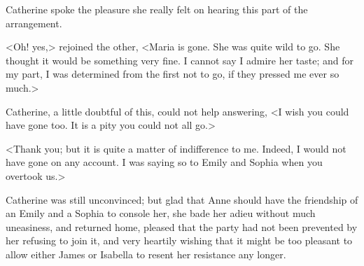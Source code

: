  Catherine spoke the pleasure she really felt on hearing this part of the arrangement. 

 <Oh! yes,> rejoined the other, <Maria is gone. She was quite wild to go. She thought it would be something very fine. I cannot say I admire her taste; and for my part, I was determined from the first not to go, if they pressed me ever so much.> 

 Catherine, a little doubtful of this, could not help answering, <I wish you could have gone too. It is a pity you could not all go.> 

 <Thank you; but it is quite a matter of indifference to me. Indeed, I would not have gone on any account. I was saying so to Emily and Sophia when you overtook us.> 

 Catherine was still unconvinced; but glad that Anne should have the friendship of an Emily and a Sophia to console her, she bade her adieu without much uneasiness, and returned home, pleased that the party had not been prevented by her refusing to join it, and very heartily wishing that it might be too pleasant to allow either James or Isabella to resent her resistance any longer. 